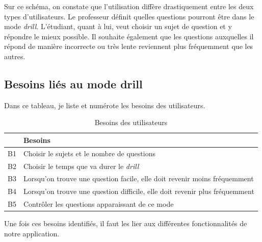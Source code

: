 
Sur ce schéma, on constate que l'utilisation diffère drastiquement entre les deux types d'utilisateurs. Le professeur définit quelles questions pourront être dans le mode \emph{drill}. L'étudiant, quant à lui, veut choisir un sujet de question et y répondre le mieux possible. Il souhaite également que les questions auxquelles il répond de manière incorrecte ou très lente reviennent plus fréquemment que les autres.

\subsection*{Besoins liés au mode drill}
Dans ce tableau, je liste et numérote les besoins des utilisateurs.
\begin{table}[h]
  \begin{center}
    \caption{Besoins des utilisateurs \label{Besoins}}
    \begin{tabular}{|l|l|}
      \hline
      \textbf{} & \textbf{Besoins}                                                            \\
      \hline
      B1        & Choisir le sujets et le nombre de questions                                 \\
      \hline
      B2        & Choisir le temps que va durer le \emph{drill}                               \\
      \hline
      B3        & Lorsqu'on trouve une question facile, elle doit revenir moins fréquemment   \\
      \hline
      B4        & Lorsqu'on trouve une question difficile, elle doit revenir plus fréquemment \\
      \hline
      B5        & Contrôler les questions apparaissant de ce mode                             \\
      \hline
    \end{tabular}
  \end{center}
\end{table}

Une fois ces besoins identifiés, il faut les lier aux différentes fonctionnalités de notre application.

